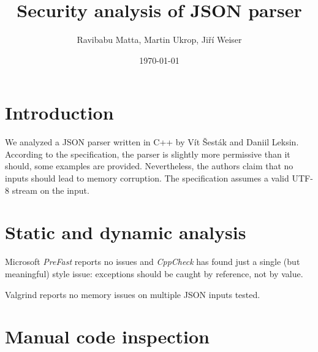\documentclass[11pt]{article}
\begin{document}
\title{Security analysis of JSON parser}
\date{\today}
\author{Ravibabu Matta, Martin Ukrop, Jiří Weiser}
\maketitle

\section{Introduction}

We analyzed a JSON parser written in C++ by Vít Šesták and Daniil Leksin. According to the specification, the parser is slightly more permissive than it should, some examples are provided. Nevertheless, the authors claim that no inputs should lead to memory corruption. The specification assumes a valid UTF-8 stream on the input.

\section{Static and dynamic analysis}

Microsoft \textit{PreFast} reports no issues and \textit{CppCheck} has found just a single (but meaningful) style issue: exceptions should be caught by reference, not by value.

Valgrind reports no memory issues on multiple JSON inputs tested.

\section{Manual code inspection}
\end{document}
